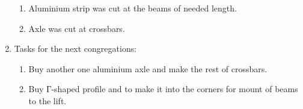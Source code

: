\begin{enumerate}
\begin{enumerate}
      \item Aluminium strip was cut at the beams of needed length.
      
      \item Axle was cut at crossbars.
      
    \end{enumerate}
    
	\item Tasks for the next congregations:
	\begin{enumerate}
	  \item Buy another one aluminium axle and make the rest of crossbars.
	  
	  \item Buy Г-shaped profile and to make it into the corners for mount of beams to the lift.

    \end{enumerate}     
\end{enumerate}
\fillpage
